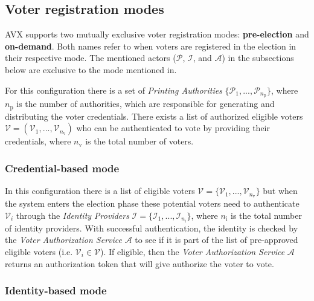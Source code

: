 \subsection{Voter registration modes} \label{sec: voter registration modes}
AVX supports two mutually exclusive voter registration modes: \textbf{pre-election} and \textbf{on-demand}. Both names refer to when voters are registered in the election in their respective mode. The mentioned actors ($\mathcal{P}$, $\mathcal{I}$, and $\mathcal{A}$) in the subsections below are exclusive to the mode mentioned in.


For this configuration there is a set of \textit{Printing Authorities} $\{\mathcal{P}_1, ..., \mathcal{P}_{n_\mathrm{p}}\}$, where $n_\mathrm{p}$ is the number of authorities, which are responsible for generating and distributing the voter credentials. There exists a list of authorized eligible voters \( \boldsymbol{\mathcal{V}} = (\mathcal{V}_1, ..., \mathcal{V}_{n_\mathrm{v}}) \) who can be authenticated to vote by providing their credentials, where $n_\mathrm{v}$ is the total number of voters.

\subsubsection{Credential-based mode} \label{sec: credential-based mode}

In this configuration there is a list of eligible voters \( \boldsymbol{\mathcal{V}} = \{\mathcal{V}_1, ..., \mathcal{V}_{n_\mathrm{v}}\} \) but when the system enters the election phase these potential voters need to authenticate $\mathcal{V}_i$ through the \textit{Identity Providers} $\boldsymbol{\mathcal{I}} = \{\mathcal{I}_1, ..., \mathcal{I}_{n_\mathrm{i}}\}$, where $n_\mathrm{i}$ is the total number of identity providers. With successful authentication, the identity is checked by the \textit{Voter Authorization Service} $\mathcal{A}$ to see if it is part of the list of pre-approved eligible voters (i.e. $\mathcal{V}_i \in \boldsymbol{\mathcal{V}}$). If eligible, then the \textit{Voter Authorization Service} $\mathcal{A}$ returns an authorization token that will give authorize the voter to vote.
\subsubsection{Identity-based mode} \label{sec: identity-based mode}
